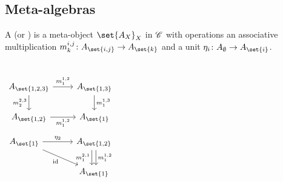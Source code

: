 \documentclass{beamer}
\begin{document}
\subsection{Meta-algebras}

\begin{frame}
        \begin{definition}\label{def:meta_algebra}
                A  (or ) is a meta-object
                $\set{A_X}_X$ in $\mathscr{C}$ with operations an associative
                multiplication $\map {\mult^{i,j}_{k}} {A_{\set{i,j}}}
                {A_{\set{k}}}$  and a unit
                $\map{\unit_{i}}{A_{\emptyset}}{A_{\set{i}}}$.
        \end{definition}
        \begin{columns}
                \begin{equation*}\label{eq:cd_mult}
                        \begin{tikzcd}[ampersand replacement=\&]
                                A_{\set{1,2,3}}
                                \rar["\mult^{1,2}_{1}"]
                                \dar["\mult^{2,3}_{2}"']
                                \&A_{\set{1,3}}
                                \dar["\mult^{1,3}_{1}"] \\
                                A_{\set{1,2}}
                                \rar["\mult^{1,2}_{1}"']
                                \&A_{\set{1}}
                        \end{tikzcd}
                \end{equation*}
                \begin{equation*}\label{eq:cd_unit}
                \begin{tikzcd}[ampersand replacement=\&,column sep=large]
                        A_{\set{1}}
                                \rar["\unit_{2}"]
                                \drar["\id"']
                        \&A_{\set{1,2}}
                                \dar["\mult^{1,2}_{1}", shift left]
                                \dar["\mult^{2,1}_{1}"', shift right] \\
                        \&A_{\set{1}}
                \end{tikzcd}
                \end{equation*}
        \end{columns}
\end{frame}
\end{document}
